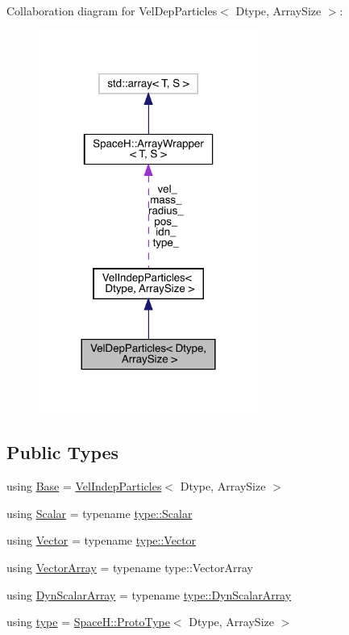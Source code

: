 Collaboration diagram for Vel\+Dep\+Particles$<$ Dtype, Array\+Size $>$\+:\nopagebreak
\begin{figure}[H]
\begin{center}
\leavevmode
\includegraphics[width=204pt]{class_vel_dep_particles__coll__graph}
\end{center}
\end{figure}
\subsection*{Public Types}
\begin{DoxyCompactItemize}
\item 
using \mbox{\hyperlink{class_vel_dep_particles_abd70b1e397d95d52875997ead48f3217}{Base}} = \mbox{\hyperlink{class_vel_indep_particles}{Vel\+Indep\+Particles}}$<$ Dtype, Array\+Size $>$
\item 
using \mbox{\hyperlink{class_vel_dep_particles_a6b347abd885de56bb37aa1222a99f76e}{Scalar}} = typename \mbox{\hyperlink{struct_space_h_1_1_proto_type_af3c8245d83d9db64749882920de5c274}{type\+::\+Scalar}}
\item 
using \mbox{\hyperlink{class_vel_dep_particles_ac1fe6e4959173444add754794a0ba2fc}{Vector}} = typename \mbox{\hyperlink{struct_space_h_1_1_proto_type_a316b81f4660b2b4fab14a8e1f23b6089}{type\+::\+Vector}}
\item 
using \mbox{\hyperlink{class_vel_dep_particles_ae3b026c9c67249406954e22b5b09f607}{Vector\+Array}} = typename type\+::\+Vector\+Array
\item 
using \mbox{\hyperlink{class_vel_dep_particles_a7b95dc56c836ef3353326deae9f18662}{Dyn\+Scalar\+Array}} = typename \mbox{\hyperlink{struct_space_h_1_1_proto_type_a8f3813f576517856e0ed74af9e5ffcb4}{type\+::\+Dyn\+Scalar\+Array}}
\item 
using \mbox{\hyperlink{class_vel_dep_particles_a0c62b43c2f0a50565e5e06587fddee18}{type}} = \mbox{\hyperlink{struct_space_h_1_1_proto_type}{Space\+H\+::\+Proto\+Type}}$<$ Dtype, Array\+Size $>$
\end{DoxyCompactItemize}
